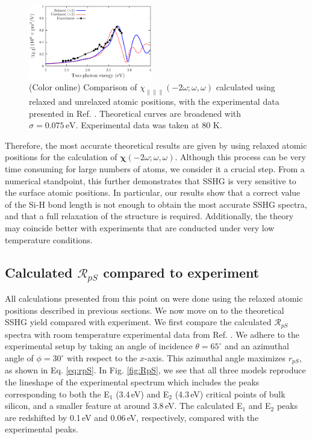 \documentclass[prb,superscriptaddress,showpacs,twocolumn,letterpaper]{revtex4}
\begin{document}
\begin{figure}[t]
\centering
\includegraphics[width=0.48\textwidth]{plots/fig2}
\caption{(Color online) Comparison of
$\chi_{\parallel\parallel\parallel}(-2\omega;\omega,\omega)$ calculated using
relaxed and unrelaxed atomic positions, with the experimental data presented in
Ref. . Theoretical curves are broadened with
$\sigma=0.075\,\text{eV}$. Experimental data was taken at 80 K.
\label{fig:Xxxx}}
\end{figure}

Therefore, the most accurate theoretical results are given by using relaxed
atomic positions for the calculation of
$\boldsymbol{\chi}(-2\omega;\omega,\omega)$. Although this process can be very
time consuming for large numbers of atoms, we consider it a crucial step. From a
numerical standpoint, this further demonstrates that SSHG is very sensitive to
the surface atomic positions. In particular, our results show that a correct
value of the Si-H bond length is not enough to obtain the most accurate SSHG
spectra, and that a full relaxation of the structure is required. Additionally,
the theory may coincide better with experiments that are conducted under very
low temperature conditions.


\subsection{Calculated \texorpdfstring{$\mathcal{R}_{pS}$}{RpS} compared to
experiment}\label{sec: RpS}

All calculations presented from this point on were done using the relaxed atomic
positions described in previous sections. We now move on to the theoretical SSHG
yield compared with experiment. We first compare the calculated
$\mathcal{R}_{pS}$ spectra with room temperature experimental data from Ref.
. We adhere to the experimental setup by taking an angle
of incidence $\theta=65^{\circ}$ and an azimuthal angle of $\phi=30^\circ$ with
respect to the $x$-axis. This azimuthal angle maximizes $r_{pS}$, as shown in
Eq. \eqref{eq:rpS}. In Fig. \ref{fig:RpS}, we see that all three models
reproduce the lineshape of the experimental spectrum which includes the peaks
corresponding to both the E$_{1}$ (3.4\,eV) and E$_{2}$ (4.3\,eV) critical
points of bulk silicon, and a smaller feature at around 3.8\,eV. The calculated
E$_{1}$ and E$_{2}$ peaks are redshifted by 0.1\,eV and 0.06\,eV, respectively,
compared with the experimental peaks.
\end{document}
